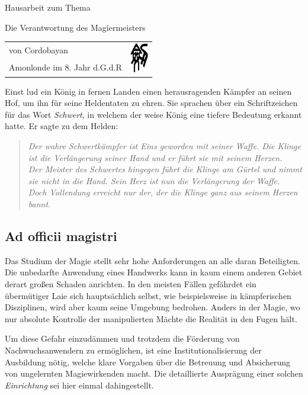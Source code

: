 \documentclass[a5paper,8pt]{book}
\begin{document}
\newcommand{\meister}{\textsl{Meister} }
\newcommand{\meisters}{\textsl{Meisters} }

\setlength{\parindent}{0pt}\centerline{{Hausarbeit zum Thema}}
\setlength{\parindent}{0pt}\centerline{\Large{Die Verantwortung des
Magiermeisters}}
\vfill 
\large
\begin{tabular}{lr}
von Cordobayan & 
\multirow{3}{*}{\includegraphics[width=0.8cm]{pictures/Schwert} }\\
Amonlonde im 8. Jahr d.G.d.R&\\
\end{tabular}
\vfill \vfill \vfill
Einst lud ein König in fernen Landen einen herausragenden Kämpfer an seinen
Hof, um ihn für seine Heldentaten zu ehren. Sie sprachen über ein
Schriftzeichen für das Wort \textit{Schwert}, in welchem der weise König eine
tiefere Bedeutung erkannt hatte. Er sagte zu dem Helden:
\begin{quote}\it
Der wahre Schwertkämpfer ist Eins geworden mit seiner Waffe. Die Klinge ist die
Verlängerung seiner Hand und er führt sie mit seinem Herzen.\\
Der Meister des Schwertes hingegen führt die Klinge am Gürtel und nimmt sie
nicht in die Hand. Sein Herz ist nun die Verlängerung der Waffe.\\
Doch Vollendung erreicht nur der, der die Klinge ganz aus seinem Herzen bannt.
\end{quote}
\newpage
\subsection*{Ad officii magistri}
Das Studium der Magie stellt sehr hohe Anforderungen an alle daran Beteiligten.
Die unbedarfte Anwendung eines Handwerks kann in kaum einem anderen Gebiet
derart großen Schaden anrichten. In den meisten Fällen gefährdet ein übermütiger Laie sich hauptsächlich selbst, wie beispielsweise in kämpferischen
Disziplinen, wird aber kaum seine Umgebung bedrohen. Anders in der Magie, wo
nur absolute Kontrolle der manipulierten Mächte die Realität in den Fugen
hält. 

Um diese Gefahr einzudämmen und trotzdem die Förderung von
Nachwuchsanwendern zu ermöglichen, ist eine Institutionalisierung der Ausbildung
nötig, welche klare Vorgaben über die Betreuung und Absicherung von ungelernten
Magiewirkenden macht. Die detaillierte Ausprägung einer solchen
\textit{Einrichtung} sei hier einmal dahingestellt.
\end{document}
